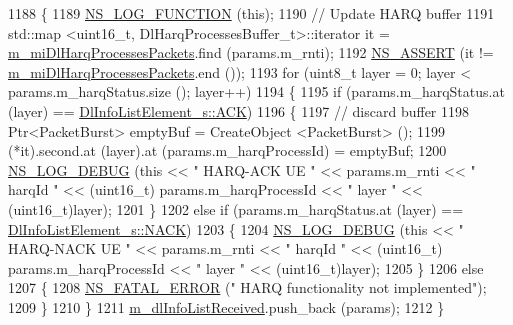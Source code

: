 \begin{DoxyCode}
1188 \{
1189   \hyperlink{log-macros-disabled_8h_a90b90d5bad1f39cb1b64923ea94c0761}{NS\_LOG\_FUNCTION} (\textcolor{keyword}{this});
1190   \textcolor{comment}{// Update HARQ buffer}
1191   std::map <uint16\_t, DlHarqProcessesBuffer\_t>::iterator it =  
      \hyperlink{classns3_1_1LteEnbMac_aaf60e2fb6f8326eeebbdec6b7e7054da}{m\_miDlHarqProcessesPackets}.find (params.m\_rnti);
1192   \hyperlink{assert_8h_a6dccdb0de9b252f60088ce281c49d052}{NS\_ASSERT} (it != \hyperlink{classns3_1_1LteEnbMac_aaf60e2fb6f8326eeebbdec6b7e7054da}{m\_miDlHarqProcessesPackets}.end ());
1193   \textcolor{keywordflow}{for} (uint8\_t layer = 0; layer < params.m\_harqStatus.size (); layer++)
1194     \{
1195       \textcolor{keywordflow}{if} (params.m\_harqStatus.at (layer) == \hyperlink{structns3_1_1DlInfoListElement__s_a3e55b89f756b7bd8909c8116a202a17aad38ddc6546e38c8a4ca738262e0401a2}{DlInfoListElement\_s::ACK})
1196         \{
1197           \textcolor{comment}{// discard buffer}
1198           Ptr<PacketBurst> emptyBuf = CreateObject <PacketBurst> ();
1199           (*it).second.at (layer).at (params.m\_harqProcessId) = emptyBuf;
1200           \hyperlink{group__logging_ga413f1886406d49f59a6a0a89b77b4d0a}{NS\_LOG\_DEBUG} (\textcolor{keyword}{this} << \textcolor{stringliteral}{" HARQ-ACK UE "} << params.m\_rnti << \textcolor{stringliteral}{" harqId "} << (uint16\_t)
      params.m\_harqProcessId << \textcolor{stringliteral}{" layer "} << (uint16\_t)layer);
1201         \}
1202       \textcolor{keywordflow}{else} \textcolor{keywordflow}{if} (params.m\_harqStatus.at (layer) == \hyperlink{structns3_1_1DlInfoListElement__s_a3e55b89f756b7bd8909c8116a202a17aaf90e76e67c86729b4ee21927b7fb1770}{DlInfoListElement\_s::NACK})
1203         \{
1204           \hyperlink{group__logging_ga413f1886406d49f59a6a0a89b77b4d0a}{NS\_LOG\_DEBUG} (\textcolor{keyword}{this} << \textcolor{stringliteral}{" HARQ-NACK UE "} << params.m\_rnti << \textcolor{stringliteral}{" harqId "} << (uint16\_t)
      params.m\_harqProcessId << \textcolor{stringliteral}{" layer "} << (uint16\_t)layer);
1205         \}
1206       \textcolor{keywordflow}{else}
1207         \{
1208           \hyperlink{group__fatal_ga5131d5e3f75d7d4cbfd706ac456fdc85}{NS\_FATAL\_ERROR} (\textcolor{stringliteral}{" HARQ functionality not implemented"});
1209         \}
1210     \}
1211   \hyperlink{classns3_1_1LteEnbMac_ad54d6efd653cfbfa7bd4dc6bec3b6d97}{m\_dlInfoListReceived}.push\_back (params);
1212 \}
\end{DoxyCode}


